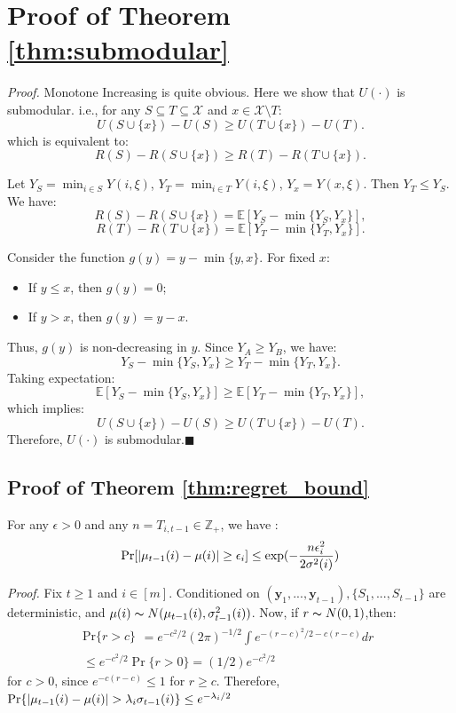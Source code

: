\documentclass[opre,sglanonrev]{informs4}
\begin{document}
\ECSwitch
\section{Proof of Theorem \ref{thm:submodular}}
\textit{Proof.} Monotone Increasing is quite obvious. Here we show that $U(\cdot)$ is submodular. i.e., for any $S \subseteq T \subseteq \mathcal{X}$ and $x \in \mathcal{X} \setminus T$:
$$
U(S \cup \{x\}) - U(S) \geq U(T \cup \{x\}) - U(T).
$$
which is equivalent to:
$$
R(S)-R(S \cup \{x\}) \geq R(T) - R(T \cup \{x\}).
$$

Let $Y_S = \min_{i \in S} Y(i,\xi)$, $Y_T = \min_{i \in T} Y(i,\xi)$, $Y_x = Y(x,\xi)$. Then $Y_T \leq Y_S$. We have:
\[
R(S) - R(S \cup \{x\}) = \mathbb{E}\left[Y_S - \min\{Y_S, Y_x\}\right],
\]
\[
R(T) - R(T \cup \{x\}) = \mathbb{E}\left[Y_T - \min\{Y_T, Y_x\}\right].
\]

Consider the function $g(y) = y - \min\{y, x\}$. For fixed $x$:
\begin{itemize}
    \item If $y \leq x$, then $g(y) = 0$;
    \item If $y > x$, then $g(y) = y - x$.
\end{itemize}
Thus, $g(y)$ is non-decreasing in $y$. Since $Y_A \geq Y_B$, we have:
\[
Y_S - \min\{Y_S, Y_x\} \geq Y_T - \min\{Y_T, Y_x\}.
\]
Taking expectation:
\[
\mathbb{E}\left[Y_S - \min\{Y_S, Y_x\}\right] \geq \mathbb{E}\left[Y_T - \min\{Y_T, Y_x\}\right],
\]
which implies:
$$
U(S \cup \{x\}) - U(S) \geq U(T \cup \{x\}) - U(T).
$$
Therefore, $U(\cdot)$ is submodular.\hfill $\blacksquare$

\subsection{Proof of Theorem \ref{thm:regret_bound}}
\begin{lemma}
For any $\epsilon > 0$ and any $n = T_{i,t-1} \in \mathbb{Z}_+$, we have :
$$
\textnormal{Pr}[|\mu_{t-1}(i)-\mu(i)|\geq \epsilon_i]\leq \exp(-\frac{n\epsilon_i^2}{2\sigma^2(i)})
$$
\end{lemma} 
\textit{Proof.} Fix $t\geq 1$ and $i\in [m]$. Conditioned on $(\mathbf{y}_1,...,\mathbf{y}_{t-1}), \{S_1,...,S_{t-1}\}$ are deterministic, and $\mu(i)\thicksim N(\mu_{t-1}(i),\sigma_{t-1}^2(i))$. Now, if $r\thicksim N(0,1)$,then: 
$$\begin{gathered}
\mathrm{Pr}\{r>c\}
\begin{aligned}
=e^{-c^2/2}(2\pi)^{-1/2}\int e^{-(r-c)^2/2-c(r-c)}dr
\end{aligned} \\
\leq e^{-c^2/2}\Pr\{r>0\}=(1/2)e^{-c^2/2}
\end{gathered}$$
for $c>0$, since $e^{-c(r-c)}\leq 1$ for $r\geq c$. Therefore, $\textnormal{Pr}\{|\mu_{t-1}(i)-\mu(i)|>\lambda_i \sigma_{t-1}(i)\}\leq e^{-\lambda_i/2}$
\end{document}
